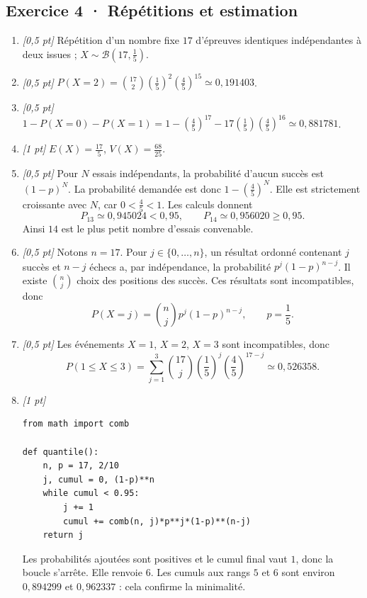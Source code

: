 \subsection*{Exercice 4 · Répétitions et estimation}\begin{enumerate}

\item \textit{[0,5 pt]} Répétition d'un nombre fixe $17$ d'épreuves identiques indépendantes à deux issues ; $X\sim\mathcal B(17,\frac{1}{5})$.

\item \textit{[0,5 pt]} $P(X=2)=\binom{17}2(\frac{1}{5})^2(\frac{4}{5})^{15}\simeq0{,}191403$.

\item \textit{[0,5 pt]} $1-P(X=0)-P(X=1)=1-(\frac{4}{5})^{17}-17(\frac{1}{5})(\frac{4}{5})^{16}\simeq0{,}881781$.

\item \textit{[1 pt]} $E(X)=\frac{17}{5}$, $V(X)=\frac{68}{25}$.

\item \textit{[0,5 pt]} Pour $N$ essais indépendants, la probabilité d'aucun succès est $(1-p)^N$. La probabilité demandée est donc $1-(\frac{4}{5})^N$. Elle est strictement croissante avec $N$, car $0<\frac{4}{5}<1$. Les calculs donnent
\[P_{13}\simeq0{,}945024<0{,}95,\qquad P_{14}\simeq0{,}956020\ge0{,}95.\]
Ainsi $14$ est le plus petit nombre d'essais convenable.

\item \textit{[0,5 pt]} Notons $n=17$. Pour $j\in\{0,\ldots,n\}$, un résultat ordonné contenant $j$ succès et $n-j$ échecs a, par indépendance, la probabilité $p^j(1-p)^{n-j}$. Il existe $\binom nj$ choix des positions des succès. Ces résultats sont incompatibles, donc
\[P(X=j)=\binom nj p^j(1-p)^{n-j},\qquad p=\frac{1}{5}.\]

\item \textit{[0,5 pt]} Les événements $X=1$, $X=2$, $X=3$ sont incompatibles, donc
\[P(1\le X\le3)=\sum_{j=1}^3\binom{17}j(\frac{1}{5})^j(\frac{4}{5})^{17-j}\simeq0{,}526358.\]


\item \textit{[1 pt]} 
\begin{lstlisting}
from math import comb

def quantile():
    n, p = 17, 2/10
    j, cumul = 0, (1-p)**n
    while cumul < 0.95:
        j += 1
        cumul += comb(n, j)*p**j*(1-p)**(n-j)
    return j
\end{lstlisting}
Les probabilités ajoutées sont positives et le cumul final vaut $1$, donc la boucle s'arrête. Elle renvoie $6$. Les cumuls aux rangs $5$ et $6$ sont environ $0{,}894299$ et $0{,}962337$ : cela confirme la minimalité.

\end{enumerate}

